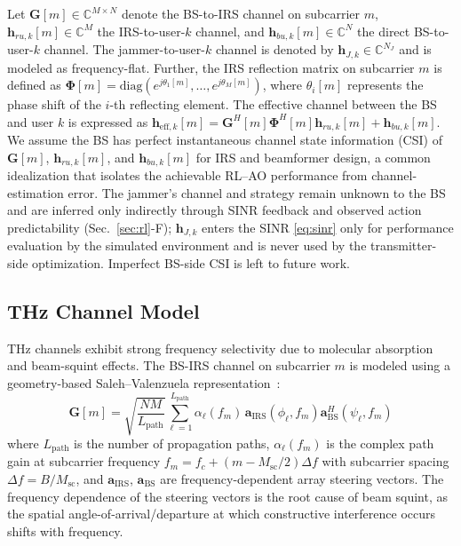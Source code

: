 \documentclass[10pt,conference]{IEEEtran}
\newcommand{\vect}[1]{\mathbf{#1}}
\newcommand{\mat}[1]{\mathbf{#1}}
\begin{document}
Let $\mathbf{G}[m] \in \mathbb{C}^{M \times N}$ denote the BS-to-IRS channel on subcarrier $m$, $\mathbf{h}_{ru,k}[m] \in \mathbb{C}^{M}$ the IRS-to-user-$k$ channel, and $\mathbf{h}_{bu,k}[m] \in \mathbb{C}^{N}$ the direct BS-to-user-$k$ channel. The jammer-to-user-$k$ channel is denoted by $\mathbf{h}_{J,k} \in \mathbb{C}^{N_J}$ and is modeled as frequency-flat. Further, the IRS reflection matrix on subcarrier $m$ is defined as
$\boldsymbol{\Phi}[m] = \mathrm{diag}\left(e^{j\theta_1[m]}, \ldots, e^{j\theta_M[m]}\right)$,
where $\theta_i[m]$ represents the phase shift of the $i$-th reflecting element. The effective channel between the BS and user $k$ is expressed as
$\mathbf{h}_{\mathrm{eff},k}[m] =
\mathbf{G}^H[m]\boldsymbol{\Phi}^H[m]\mathbf{h}_{ru,k}[m] + \mathbf{h}_{bu,k}[m].$
We assume the BS has perfect instantaneous channel state information (CSI) of $\mathbf{G}[m]$, $\mathbf{h}_{ru,k}[m]$, and $\mathbf{h}_{bu,k}[m]$ for IRS and beamformer design, a common idealization that isolates the achievable RL--AO performance from channel-estimation error. The jammer's channel and strategy remain unknown to the BS and are inferred only indirectly through SINR feedback and observed action predictability (Sec.~\ref{sec:rl}-F); $\mathbf{h}_{J,k}$ enters the SINR \eqref{eq:sinr} only for performance evaluation by the simulated environment and is never used by the transmitter-side optimization. Imperfect BS-side CSI is left to future work.

\subsection{THz Channel Model}

THz channels exhibit strong frequency selectivity due to molecular absorption and beam-squint effects. The BS-IRS channel on subcarrier $m$ is modeled using a geometry-based Saleh--Valenzuela representation~\cite{su2023wideband}:
\begin{equation}
\mat{G}[m] = \sqrt{\frac{N M}{L_{\text{path}}}} \sum_{\ell=1}^{L_{\text{path}}} \alpha_\ell(f_m)\, \vect{a}_{\text{IRS}}(\phi_\ell, f_m) \vect{a}_{\text{BS}}^H(\psi_\ell, f_m)
\label{eq:thz_channel}
\end{equation}
where $L_{\text{path}}$ is the number of propagation paths, $\alpha_\ell(f_m)$ is the complex path gain at subcarrier frequency $f_m = f_c + (m - M_{\text{sc}}/2)\Delta f$ with subcarrier spacing $\Delta f = B/M_{\text{sc}}$, and $\vect{a}_{\text{IRS}}$, $\vect{a}_{\text{BS}}$ are frequency-dependent array steering vectors. The frequency dependence of the steering vectors is the root cause of beam squint, as the spatial angle-of-arrival/departure at which constructive interference occurs shifts with frequency.
\end{document}
